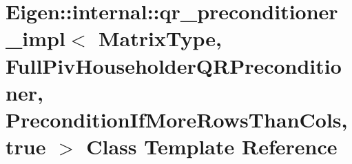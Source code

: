 \hypertarget{class_eigen_1_1internal_1_1qr__preconditioner__impl_3_01_matrix_type_00_01_full_piv_householder_b68efcf0da0383d73ce7fb20aafa2293}{}\section{Eigen\+:\+:internal\+:\+:qr\+\_\+preconditioner\+\_\+impl$<$ Matrix\+Type, Full\+Piv\+Householder\+Q\+R\+Preconditioner, Precondition\+If\+More\+Rows\+Than\+Cols, true $>$ Class Template Reference}
\label{class_eigen_1_1internal_1_1qr__preconditioner__impl_3_01_matrix_type_00_01_full_piv_householder_b68efcf0da0383d73ce7fb20aafa2293}
